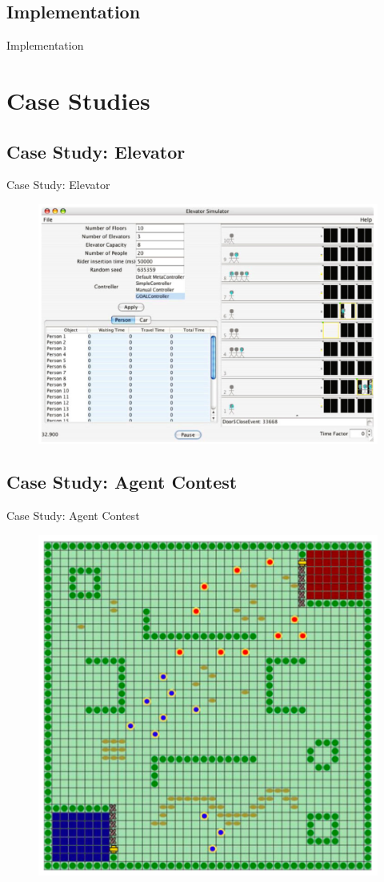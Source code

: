 \documentclass[t]{beamer}
\begin{document}
\subsection{Implementation}
\begin{frame}{Implementation}
\end{frame}
\section{Case Studies}
\subsection{Case Study: Elevator}
\begin{frame}{Case Study: Elevator}
	\begin{figure}
		\includegraphics[width=0.6\linewidth]{elevator}
	\end{figure}
\end{frame}
\subsection{Case Study: Agent Contest}
\begin{frame}{Case Study: Agent Contest}
	\begin{figure}
		\includegraphics[width=0.6\linewidth]{cowboys}
	\end{figure}
\end{frame}
\end{document}
